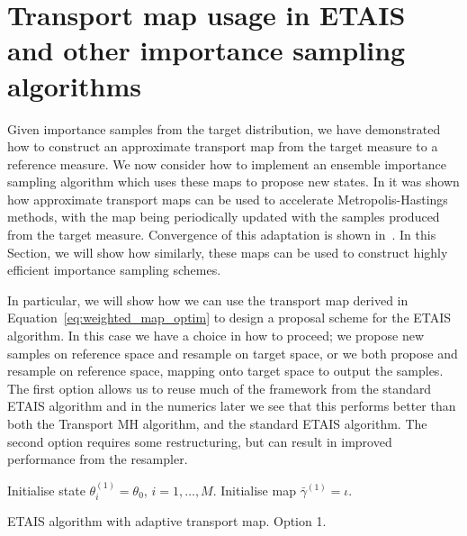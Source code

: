 \documentclass[final]{siamltex}
\begin{document}
\section[Transport map MCMC]{Transport map usage in ETAIS
  and other importance sampling algorithms}\label{sec:TETAIS}

Given importance samples from the target distribution, we have demonstrated how to construct an approximate transport map from the
target measure to a reference measure. We now consider how to
implement an ensemble importance sampling algorithm which uses
these maps to propose new states. In \cite{parno2014transport} it was
shown how approximate transport maps can be used to accelerate
Metropolis-Hastings methods, with the map being periodically updated
with the samples produced from the target measure. Convergence of this
adaptation is shown in~\cite{parno2014transport}. In this Section, we
will show how similarly, these maps can be used to construct highly
efficient importance sampling schemes.

In particular, we will show how we can use the transport map derived in Equation~\eqref{eq:weighted_map_optim} to
design a proposal scheme for the ETAIS algorithm. In this case we have a choice in how to proceed; we
propose new samples on reference space and resample on target space, or we both propose and resample on reference space, mapping onto target space to output the samples. The first option allows us to reuse much of the framework
from the standard ETAIS algorithm and in the numerics later we see that this performs better than
both the Transport MH algorithm, and the standard ETAIS algorithm. The second option requires some
restructuring, but can result in improved performance from the resampler.

\begin{table}
\begin{algorithm}[H]
\DontPrintSemicolon
\BlankLine
Initialise state $\theta^{(1)}_i = \theta_0$, \quad $i = 1,\dots,M$.\;
Initialise map $\bar{\gamma}^{(1)} = \iota$.\;
\caption{ETAIS algorithm with adaptive transport map. Option 1.\label{alg:TransportETAIS1}}
\end{algorithm}
\end{table}
\end{document}
